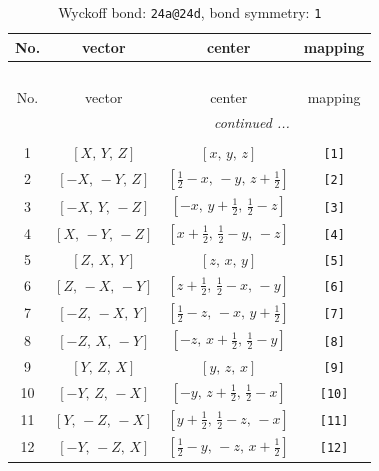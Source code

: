 \documentclass[fleqn,8pt]{jsarticle}
\begin{document}
\begin{longtable}{cccc}
\caption{Wyckoff bond: {\tt 24a@24d}, bond symmetry: {\tt 1}}
 \\
 \hline \hline
No. & vector & center & mapping \\ \hline \endfirsthead

\multicolumn{3}{l}{\tablename\ \thetable{}} \\
 \hline \hline
No. & vector & center & mapping \\ \hline \endhead

 \hline \hline
\multicolumn{3}{r}{\footnotesize\it continued ...} \\ \endfoot

 \hline \hline
\multicolumn{3}{r}{} \\ \endlastfoot

1 & $\left[ X,\, Y,\, Z \right]$ & $\left[ x,\, y,\, z \right]$ & {\tt [1]} \\ \hline
2 & $\left[ - X,\, - Y,\, Z \right]$ & $\left[ \frac{1}{2} - x,\, - y,\, z + \frac{1}{2} \right]$ & {\tt [2]} \\ \hline
3 & $\left[ - X,\, Y,\, - Z \right]$ & $\left[ - x,\, y + \frac{1}{2},\, \frac{1}{2} - z \right]$ & {\tt [3]} \\ \hline
4 & $\left[ X,\, - Y,\, - Z \right]$ & $\left[ x + \frac{1}{2},\, \frac{1}{2} - y,\, - z \right]$ & {\tt [4]} \\ \hline
5 & $\left[ Z,\, X,\, Y \right]$ & $\left[ z,\, x,\, y \right]$ & {\tt [5]} \\ \hline
6 & $\left[ Z,\, - X,\, - Y \right]$ & $\left[ z + \frac{1}{2},\, \frac{1}{2} - x,\, - y \right]$ & {\tt [6]} \\ \hline
7 & $\left[ - Z,\, - X,\, Y \right]$ & $\left[ \frac{1}{2} - z,\, - x,\, y + \frac{1}{2} \right]$ & {\tt [7]} \\ \hline
8 & $\left[ - Z,\, X,\, - Y \right]$ & $\left[ - z,\, x + \frac{1}{2},\, \frac{1}{2} - y \right]$ & {\tt [8]} \\ \hline
9 & $\left[ Y,\, Z,\, X \right]$ & $\left[ y,\, z,\, x \right]$ & {\tt [9]} \\ \hline
10 & $\left[ - Y,\, Z,\, - X \right]$ & $\left[ - y,\, z + \frac{1}{2},\, \frac{1}{2} - x \right]$ & {\tt [10]} \\ \hline
11 & $\left[ Y,\, - Z,\, - X \right]$ & $\left[ y + \frac{1}{2},\, \frac{1}{2} - z,\, - x \right]$ & {\tt [11]} \\ \hline
12 & $\left[ - Y,\, - Z,\, X \right]$ & $\left[ \frac{1}{2} - y,\, - z,\, x + \frac{1}{2} \right]$ & {\tt [12]} \\ \hline

\end{longtable}
\end{document}

